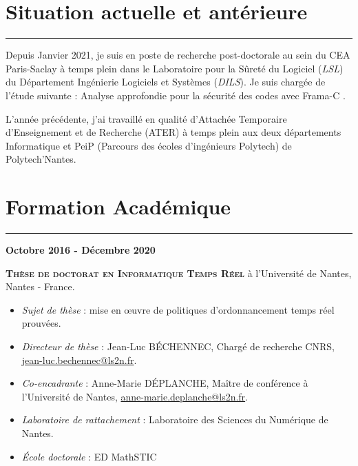 \vspace{0.5cm}

\section{Situation actuelle et antérieure}
\vspace{-0.6cm}
\hspace{0.7cm}\textcolor{myblue}{\rule{15cm}{1mm}}

\vspace{0.5cm}

Depuis Janvier 2021, je suis en poste de recherche post-doctorale au sein du CEA Paris-Saclay à temps plein dans le Laboratoire pour la Sûreté du Logiciel (\textit{LSL}) du Département Ingénierie Logiciels et Systèmes (\textit{DILS}). Je suis chargée de l'étude suivante : \og Analyse approfondie pour la sécurité des codes avec Frama-C \fg.

L'année précédente, j'ai travaillé en qualité d'Attachée Temporaire d'Enseignement et de Recherche (ATER) à temps plein aux deux départements Informatique et PeiP (Parcours des écoles d'ingénieurs Polytech) de Polytech'Nantes.


\section{Formation Académique}
\vspace{-0.6cm}
\hspace{0.7cm}\textcolor{myblue}{\rule{15cm}{1mm}}

\vspace{0.5cm}


\hspace{-0.7cm}\textbf{Octobre 2016 - Décembre 2020}

		\textbf{\textsc{Thèse de doctorat en Informatique Temps Réel}} à l'Université de Nantes, Nantes - France.
		\begin{itemize}[label=-]
			\itemsep0em 
			
			\item \textit{Sujet de thèse }: mise en œuvre de politiques d'ordonnancement temps réel prouvées.
			
			\item \textit{Directeur de thèse }: Jean-Luc B\'{E}CHENNEC, Chargé de recherche CNRS, \url{jean-luc.bechennec@ls2n.fr}.
			
			\item \textit{Co-encadrante }: Anne-Marie D\'{E}PLANCHE, Maître de conférence à l'Université de Nantes, \url{anne-marie.deplanche@ls2n.fr}.
			
			\item\textit{Laboratoire de rattachement} : Laboratoire des Sciences du Numérique de Nantes.
			
			\item\textit{École doctorale} : ED MathSTIC \footnotemark
			
		\end{itemize}


